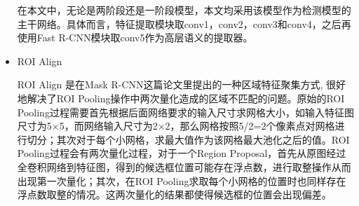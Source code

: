 \begin{itemize}
\begin{comment}
         layer name& output size &\multicolumn{3}{c}{101-layer} \\
        \hline
         conv1 & 112$\times$112 & \multicolumn{3}{c}{7$\times$7, 64, stride 2}\\
        \hline
        conv2\_x& 56$\times$56 & \multicolumn{3}{c}{$\left[ \begin{array}{c}{1 \times 1,64} \\ {3 \times 3,64} \\ {1 \times 1,256}\end{array}\right] \times 3$}\\
        \hline
        conv3\_x & 28$\times$28 & \multicolumn{3}{c}{$\left[ \begin{array}{c}{1 \times 1,128} \\ {3 \times 3,128} \\ {1 \times 1,512}\end{array}\right] \times 4$}\\
        \hline
        conv4\_x & 14$\times$14 & \multicolumn{3}{c}{$\left[ \begin{array}{c}{1 \times 1,256} \\ {3 \times 3,256} \\ {1 \times 1,1024}\end{array}\right] \times 23$}\\
        \hline
        conv5\_x & 7$\times$7 & \multicolumn{3}{c}{$\left[ \begin{array}{c}{1 \times 1,512} \\ {3 \times 3,512} \\ {1 \times 1,2048}\end{array}\right] \times 3$}\\
        \hline
        & 1$\times$1 &\multicolumn{3}{c}{average pool, 1000-d fc, softmax} \\
        \hline
    \end{tabular}
\end{table}
\end{comment}

在本文中，无论是两阶段还是一阶段模型，本文均采用该模型作为检测模型的主干网络。具体而言，特征提取模块取conv1，conv2，conv3和conv4，之后再使用Fast R-CNN模块取conv5作为高层语义的提取器。
\item ROI Align 

ROI Align 是在Mask R-CNN\cite{62he2017mask}这篇论文里提出的一种区域特征聚集方式, 很好地解决了ROI Pooling操作中两次量化造成的区域不匹配的问题。原始的ROI Pooling过程需要首先根据后面网络要求的输入尺寸求网格大小，如输入特征图尺寸为5×5，而网络输入尺寸为2×2，那么网格按照5/2=2个像素点对网格进行切分；其次对于每个小网格，求最大值作为该网格最大池化之后的值。ROI Pooling过程会有两次量化过程，对于一个Region Proposal，首先从原图经过全卷积网络到特征图，得到的候选框位置可能存在浮点数，进行取整操作从而出现第一次量化；其次，在ROI Pooling求取每个小网格的位置时也同样存在浮点数取整的情况。这两次量化的结果都使得候选框的位置会出现偏差。


\end{itemize}
